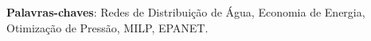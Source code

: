 
\setlength{\absparsep}{18pt} %
\begin{resumo}
\noindent

\vspace{\onelineskip}
	
\noindent\textbf{Palavras-chaves}: Redes de Distribuição de Água, Economia de Energia, Otimização de Pressão, MILP, EPANET. 
\end{resumo}


